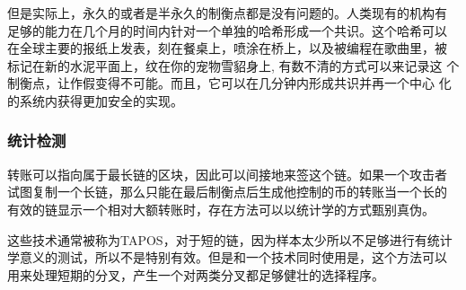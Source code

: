 \documentclass[letterpaper]{article}
\begin{document}
但是实际上，永久的或者是半永久的制衡点都是没有问题的。人类现有的机构有
足够的能力在几个月的时间内针对一个单独的哈希形成一个共识。这个哈希可以
在全球主要的报纸上发表，刻在餐桌上，喷涂在桥上，以及被编程在歌曲里，被
标记在新的水泥平面上，纹在你的宠物雪貂身上, 有数不清的方式可以来记录这
个制衡点，让作假变得不可能。而且，它可以在几分钟内形成共识并再一个中心
化的系统内获得更加安全的实现。

\subsubsection{统计检测}
转账可以指向属于最长链的区块，因此可以间接地来签这个链。如果一个攻击者
试图复制一个长链，那么只能在最后制衡点后生成他控制的币的转账当一个长的
有效的链显示一个相对大额转账时，存在方法可以以统计学的方式甄别真伪。

这些技术通常被称为TAPOS，对于短的链，因为样本太少所以不足够进行有统计
学意义的测试，所以不是特别有效。但是和一个技术同时使用是，这个方法可以
用来处理短期的分叉，产生一个对两类分叉都足够健壮的选择程序。
\end{document}
